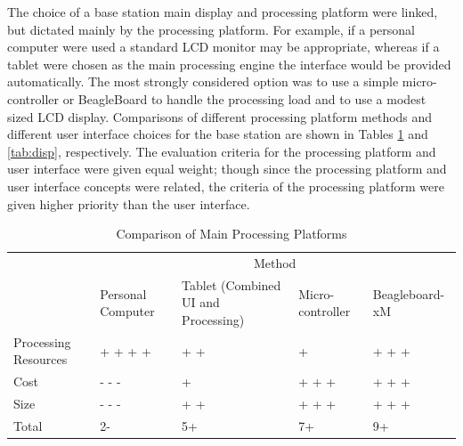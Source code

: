 \documentclass[11pt]{article} %
\begin{document}
\quad \newline
The choice of a base station main display and processing platform were linked, but dictated mainly by the processing platform. For example, if a personal computer were used a standard LCD monitor may be appropriate, whereas if a tablet were chosen as the main processing engine the interface would be provided automatically. The most strongly considered option was to use a simple micro-controller or BeagleBoard to handle the processing load and to use a modest sized LCD display. Comparisons of different processing platform methods and different user interface choices for the base station are shown in Tables \ref{tab:proc} and \ref{tab:disp}, respectively. The evaluation criteria for the processing platform and user interface were given equal weight; though since the processing platform and user interface concepts were related, the criteria of the processing platform were given higher priority than the user interface.
\begin{table}[h!]
\caption{Comparison of Main Processing Platforms}
\begin{tabular}{| p{1.5in} | p{.75in} | p{1.3in} | p{0.75in} | p{1.15in} | }
\cline{2-5}
\multicolumn{1}{c}{}&\multicolumn{4}{|c|}{Method} \\
\cline{2-5}
\multicolumn{1}{c|}{}&Personal \newline Computer&Tablet (Combined \newline UI and Processing)&Micro-controller & Beagleboard-xM\\
\hline
Processing Resources&+ + + +&+ +&+&+ + +\\
\hline
Cost &- - -& + &+ + +&+ + +\\
\hline
Size&- - -&+ +&+ + +& + + +\\
\hline
\hline
Total &2-&5+&7+& 9+\\
\hline
\end{tabular}
\label{tab:proc}
\end{table}
\end{document}
